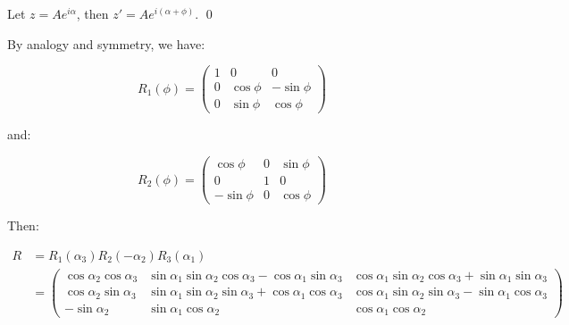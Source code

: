 \documentclass[12pt]{article}
\begin{document}
Let $z = Ae^{i\alpha}$, then $z' = Ae^{i(\alpha + \phi)}$.
\qed



By analogy and symmetry, we have:

\begin{equation}
    R_{1}(\phi) = \begin{pmatrix}
        1 & 0          & 0           \\
        0 & \cos{\phi} & -\sin{\phi} \\
        0 & \sin{\phi} & \cos{\phi}
    \end{pmatrix}
\end{equation}

and:

\begin{equation}
    R_{2}(\phi) = \begin{pmatrix}
        \cos{\phi}  & 0 & \sin{\phi} \\
        0           & 1 & 0          \\
        -\sin{\phi} & 0 & \cos{\phi}
    \end{pmatrix}
\end{equation}

Then:

\begin{equation}
    \begin{split}
        R &= R_{1}(\alpha_{3}) R_{2}(-\alpha_{2}) R_{3}({\alpha_{1}}) \\
        &=
        \begin{pmatrix}
            \cos{\alpha_{2}} \cos{\alpha_{3}} & \sin{\alpha_{1}} \sin{\alpha_{2}} \cos{\alpha_{3}} - \cos{\alpha_{1}} \sin{\alpha_{3}} & \cos{\alpha_{1}} \sin{\alpha_{2}} \cos{\alpha_{3}} + \sin{\alpha_{1}} \sin{\alpha_{3}} \\
            \cos{\alpha_{2}} \sin{\alpha_{3}} & \sin{\alpha_{1}} \sin{\alpha_{2}} \sin{\alpha_{3}} + \cos{\alpha_{1}} \cos{\alpha_{3}} & \cos{\alpha_{1}} \sin{\alpha_{2}} \sin{\alpha_{3}} - \sin{\alpha_{1}} \cos{\alpha_{3}} \\
            -\sin{\alpha_{2}}                 & \sin{\alpha_{1}} \cos{\alpha_{2}}                                                      & \cos{\alpha_{1}} \cos{\alpha_{2}}
        \end{pmatrix}
    \end{split}
\end{equation}

\end{document}
